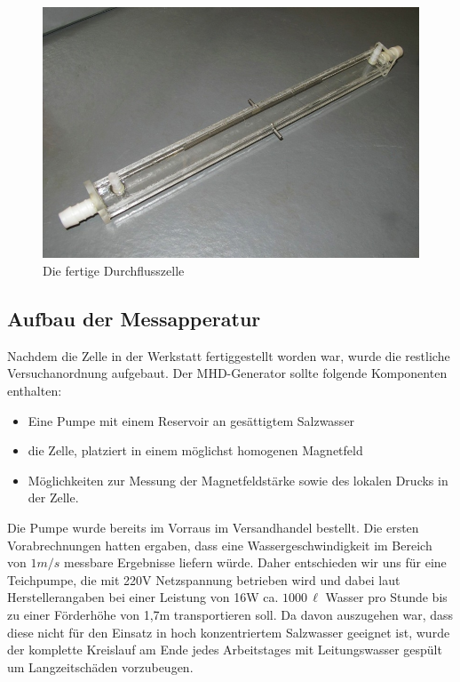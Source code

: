 \documentclass[11pt]{scrartcl}
\newcommand{\unit}[1]{\ensuremath{\,\mathrm{#1}}} %
\begin{document}
\begin{figure}[ht]
\begin{center}
\includegraphics[width=1.0\textwidth]{images/zelle-einzeln.jpg}
\end{center}
\vspace{-1.5\baselineskip}
\caption{Die fertige Durchflusszelle}
\label{zelle-einzeln}
\end{figure}

\subsection{Aufbau der Messapperatur}		%
Nachdem die Zelle in der Werkstatt fertiggestellt worden war, wurde die restliche Versuchanordnung aufgebaut. Der MHD-Generator sollte folgende Komponenten enthalten:

\begin{itemize}
	\item Eine Pumpe mit einem Reservoir an ges\"attigtem Salzwasser 
	\item die Zelle, platziert in einem m\"oglichst homogenen Magnetfeld 	
	\item M\"oglichkeiten zur Messung der Magnetfeldst\"arke sowie des lokalen Drucks in der Zelle.
\end{itemize}

Die Pumpe wurde bereits im Vorraus im Versandhandel bestellt. Die ersten Vorabrechnungen hatten ergaben, dass eine Wassergeschwindigkeit im Bereich von $1m/s$ messbare Ergebnisse liefern w\"urde. Daher entschieden wir uns f\"ur eine Teichpumpe, die mit 220V Netzspannung betrieben wird und dabei laut Herstellerangaben bei einer Leistung von 16W ca. $1000\unit{\ell}$ Wasser pro Stunde bis zu einer F\"orderh\"ohe von 1,7m transportieren soll. Da davon auszugehen war, dass diese nicht f\"ur den Einsatz in hoch konzentriertem Salzwasser geeignet ist, wurde der komplette Kreislauf am Ende jedes Arbeitstages mit Leitungswasser gesp\"ult um Langzeitsch\"aden vorzubeugen.
\end{document}

